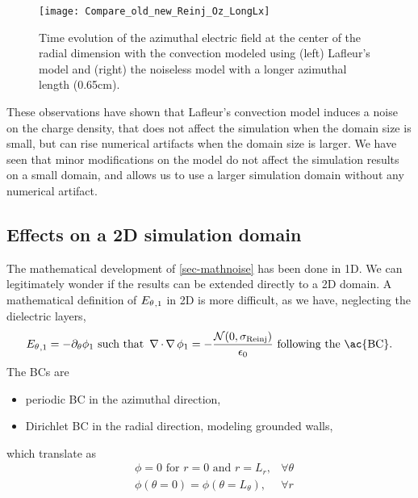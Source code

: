       \begin{figure}[!hbt]
        \centering
        \texttt{[image: Compare\_old\_new\_Reinj\_Oz\_LongLx]}
        \caption{Time evolution of the azimuthal electric field at the center of the radial dimension with the convection modeled using (left) Lafleur's model and (right) the noiseless model with a longer azimuthal length (0.65cm).}
        \label{fig-oldeconv_newconv_longLZ}
      \end{figure}


      These observations have shown that Lafleur's convection model induces a noise on the charge density, that does not affect the simulation when the domain size is small, but can rise numerical artifacts when the domain size is larger.
      We have seen that minor modifications on the model do not affect the simulation results on a small domain, and allows us to use a larger simulation domain without any numerical artifact.
      
      
          
    \subsection{Effects on a \acs{2D} simulation domain}
      
      The mathematical development of \cref{sec-mathnoise} has been done in \ac{1D}.
      We can legitimately wonder if the results  can be extended directly to a \ac{2D} domain.
      A mathematical definition of ${E_{\theta}}_{, 1}$ in \ac{2D} is more difficult, as we have, neglecting the dielectric layers,
      \begin{equation} \label{eq-aziE}
        \aziE_{, 1} = -\partial_{\theta} \phi_1 \text{ such that } \grad \cdot \grad \phi_1 = - \frac { \N(0, \stdconv)}{\epsilon_0} \text{ following the \ac{BC}}.
      \end{equation}
      The \ac{BC}s are
      \begin{itemize}
        \item periodic \ac{BC} in the azimuthal direction,
        \item Dirichlet \ac{BC} in the radial direction, modeling grounded walls,
      \end{itemize}
      which translate as
      \begin{align}
        &\phi = 0 \text{ for } r=0 \text{ and } r=L_r, &\forall \theta \label{eq-BC1} \\
        &\phi(\theta = 0)= \phi(\theta = L_{\theta}) , &\forall r \label{eq-BC2}
      \end{align}
      
